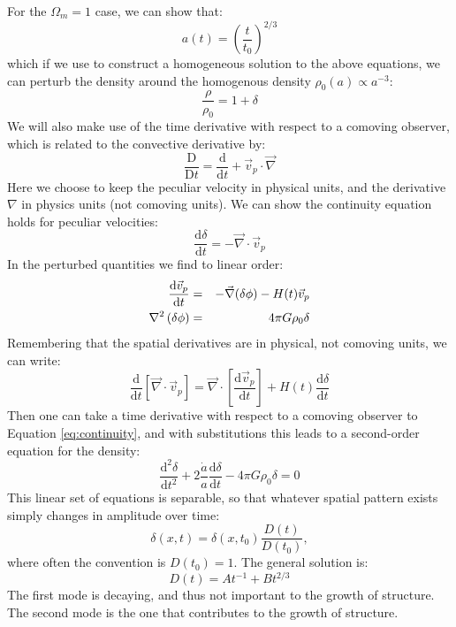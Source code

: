 For the $\Omega_m = 1$ case, we can show that:
\begin{equation}
a(t) = \left(\frac{t}{t_0}\right)^{2/3}
\end{equation} 
which if we use to construct a homogeneous solution to the above
equations, we can perturb the density around the homogenous density
$\rho_0(a) \propto a^{-3}$:
\begin{equation}
\frac{\rho}{\rho_0} = 1+ \delta
\end{equation}
We will also make use of the time derivative with respect to a
comoving observer, which is related to the convective derivative by:
\begin{equation}
\frac{\mathrm{D}}{\mathrm{D}t} = \frac{\mathrm{d}}{\mathrm{d} t} +
\vec{v}_p\cdot\vec{\nabla}
\end{equation}
Here we choose to keep the peculiar velocity in physical units, and
the derivative $\nabla$ in physics units (not comoving units).  We can
show the continuity equation holds for peculiar velocities:
\begin{equation}
\label{eq:continuity}
\frac{\mathrm{d}\delta}{\mathrm{d}t} =  
- \vec\nabla\cdot\vec{v}_p
\end{equation}
In the perturbed quantities we find to linear order:
\begin{eqnarray}
\frac{\mathrm{d}\vec{v}_p}{\mathrm{d}t} &=&
- \vec\nabla(\delta\phi)
- H(t) \vec{v}_p \cr
\nabla^2\left(\delta\phi\right)&=& 4\pi G \rho_0 \delta
\end{eqnarray}
Remembering that the spatial derivatives are in physical, not comoving
units, we can write:
\begin{equation}
\frac{\mathrm{d}}{\mathrm{d}t} \left[ \vec\nabla\cdot\vec{v}_p \right]
= 
\vec\nabla\cdot
\left[\frac{\mathrm{d}\vec{v}_p}{\mathrm{d}t} \right]
+ H(t) \frac{\mathrm{d}\delta}{\mathrm{d}t} 
\end{equation}
Then one can take a time derivative with respect to a comoving
observer to Equation \ref{eq:continuity}, and with substitutions this
leads to a second-order equation for the density:
\begin{equation}
\label{eq:secondorder}
\frac{\mathrm{d}^2\delta}{\mathrm{d}t^2} + 2 \frac{\dot a}{a} 
\frac{\mathrm{d}\delta}{\mathrm{d}t} - 4 \pi G \rho_0 \delta = 0 
\end{equation}
This linear set of equations is separable, so that whatever spatial
pattern exists simply changes in amplitude over time:
\begin{equation}
\delta(x, t) = \delta(x, t_0) \frac{D(t)}{D(t_0)},
\end{equation}
where often the convention is $D(t_0) = 1$.
  The general solution is:
\begin{equation}
\label{eq:lineargrowth}
D(t) = A t^{-1} + B t^{2/3}
\end{equation}
The first mode is decaying, and thus not important to the growth
of structure.  The second mode is the one that contributes to the
growth of structure.

